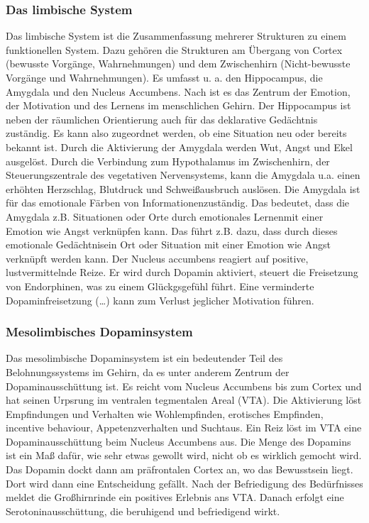 \subsubsection{Das limbische System}
\label{sec:DasLimbischeSystem}
Das limbische System ist die Zusammenfassung mehrerer Strukturen zu einem funktionellen System. Dazu gehören die Strukturen am \glqq Übergang von Cortex (bewusste Vorgänge, Wahrnehmungen) und dem Zwischenhirn (Nicht-bewusste Vorgänge und Wahrnehmungen).\grqq \citep[S. 36]{Derouiche.2011} Es umfasst u. a. den Hippocampus, die Amygdala und den Nucleus Accumbens. Nach \citet[S. 270]{Kirschbaum.2008} ist es das  \glqq Zentrum der Emotion, der Motivation und des Lernens im menschlichen Gehirn.\grqq 
\newline Der Hippocampus ist neben der räumlichen Orientierung auch für das deklarative Gedächtnis zuständig. Es kann also zugeordnet werden, ob eine Situation neu oder bereits bekannt ist. \citep[S. 36]{Derouiche.2011} Durch die Aktivierung der Amygdala werden Wut, Angst und Ekel ausgelöst. Durch die Verbindung zum Hypothalamus im Zwischenhirn, der Steuerungszentrale des vegetativen Nervensystems, kann die Amygdala u.a. einen erhöhten Herzschlag, Blutdruck und Schweißausbruch auslösen. \citep[S. 36f]{Derouiche.2011} Die Amygdala ist für das \glqq emotionale Färben von Informationen\grqq zuständig. \citep[S. 12]{Kirschbaum.2008} Das bedeutet, dass die Amygdala z.B. Situationen oder Orte durch \glqq emotionales Lernen\grqq mit einer Emotion wie Angst verknüpfen kann. Das führt z.B. dazu, dass durch dieses \glqq emotionale Gedächtnis\grqq ein Ort oder Situation mit einer Emotion wie Angst verknüpft werden kann. \citep[S. 37]{Derouiche.2011}    
\newline Der Nucleus accumbens reagiert auf positive, lustvermittelnde Reize. Er wird durch Dopamin aktiviert, steuert die Freisetzung von Endorphinen, was zu einem Glückgsgefühl führt. \glqq Eine verminderte Dopaminfreisetzung (…) kann zum Verlust jeglicher Motivation führen.\grqq \citep[S. 11]{Nowka.2013}

\subsubsection{Mesolimbisches Dopaminsystem}
Das mesolimbische Dopaminsystem ist ein bedeutender Teil des Belohnungssystems im Gehirn, da es unter anderem Zentrum der Dopaminausschüttung ist. Es  reicht vom Nucleus Accumbens bis zum Cortex und hat seinen Urpsrung im ventralen tegmentalen Areal (VTA). \citep[S. 11]{Nowka.2013} Die Aktivierung löst \glqq Empfindungen und Verhalten wie Wohlempfinden, erotisches Empfinden, \glqq incentive behaviour\grqq, Appetenzverhalten und Sucht\grqq aus. \cite[S. 37]{Derouiche.2011} 
\newline Ein Reiz löst im VTA eine Dopaminausschüttung beim Nucleus Accumbens aus. Die Menge des Dopamins ist ein Maß dafür, wie sehr etwas gewollt wird, nicht ob es wirklich gemocht wird. Das Dopamin dockt dann am präfrontalen Cortex an, wo das Bewusstsein liegt. Dort wird dann eine Entscheidung gefällt. Nach der Befriedigung des Bedürfnisses meldet die Großhirnrinde ein positives Erlebnis ans VTA. Danach erfolgt eine Serotoninausschüttung, die beruhigend und befriedigend wirkt. \cite[S. 16]{Seelbach.2011}

